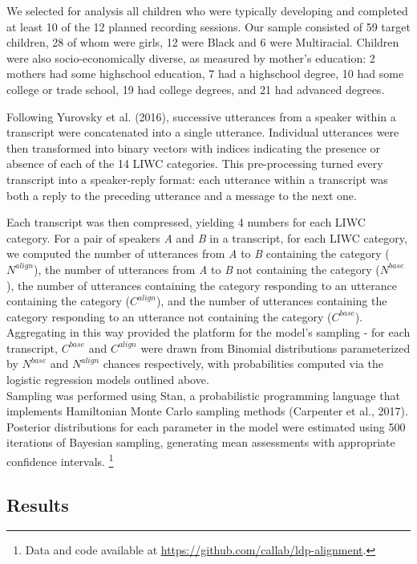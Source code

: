 \documentclass[10pt, letterpaper]{article}
\begin{document}
We selected for analysis all children who were typically developing and
completed at least 10 of the 12 planned recording sessions. Our sample
consisted of 59 target children, 28 of whom were girls, 12 were Black
and 6 were Multiracial. Children were also socio-economically diverse,
as measured by mother's education: 2 mothers had some highschool
education, 7 had a highschool degree, 10 had some college or trade
school, 19 had college degrees, and 21 had advanced degrees.

Following Yurovsky et al. (2016), successive utterances from a speaker
within a transcript were concatenated into a single utterance.
Individual utterances were then transformed into binary vectors with
indices indicating the presence or absence of each of the 14 LIWC
categories. This pre-processing turned every transcript into a
speaker-reply format: each utterance within a transcript was both a
reply to the preceding utterance and a message to the next one.

Each transcript was then compressed, yielding 4 numbers for each LIWC
category. For a pair of speakers \emph{A} and \emph{B} in a transcript,
for each LIWC category, we computed the number of utterances from
\emph{A} to \emph{B} containing the category (\(N^{align}\)), the number
of utterances from \emph{A} to \emph{B} not containing the category
(\(N^{base}\)), the number of utterances containing the category
responding to an utterance containing the category (\(C^{align}\)), and
the number of utterances containing the category responding to an
utterance not containing the category (\(C^{base}\)). Aggregating in
this way provided the platform for the model's sampling - for each
transcript, \(C^{base}\) and \(C^{align}\) were drawn from Binomial
distributions parameterized by \(N^{base}\) and \(N^{align}\) chances
respectively, with probabilities computed via the logistic regression
models outlined above.\\
Sampling was performed using Stan, a probabilistic programming language
that implements Hamiltonian Monte Carlo sampling methods (Carpenter et
al., 2017). Posterior distributions for each parameter in the model were
estimated using 500 iterations of Bayesian sampling, generating mean
assessments with appropriate confidence intervals.
\footnote{Data and code available at \url{https://github.com/callab/ldp-alignment}.}

\hypertarget{results}{%
\subsection{Results}\label{results}}
\end{document}
